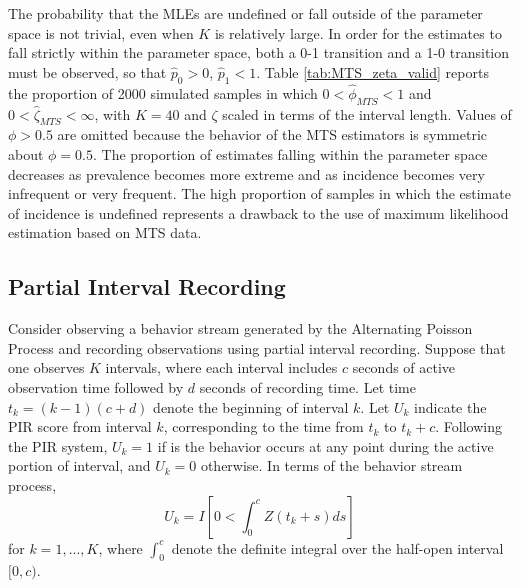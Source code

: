 \documentclass[man, noextraspace, floatsintext]{apa6}\usepackage[]{graphicx}\usepackage[]{color}
\begin{document}
The probability that the MLEs are undefined or fall outside of the parameter space is not trivial, even when $K$ is relatively large. 
In order for the estimates to fall strictly within the parameter space, both a 0-1 transition and a 1-0 transition must be observed, so that $\hat{p}_0 > 0$, $\hat{p}_1 < 1$. Table \ref{tab:MTS_zeta_valid} reports the proportion of 2000 simulated samples in which $0 < \hat\phi_{MTS} < 1$ and $0 < \hat\zeta_{MTS} < \infty$, with $K = 40$ and $\zeta$ scaled in terms of the interval length. 
Values of $\phi > 0.5$ are omitted because the behavior of the MTS estimators is symmetric about $\phi = 0.5$. 
The proportion of estimates falling within the parameter space decreases as prevalence becomes more extreme and as incidence becomes very infrequent or very frequent. 
The high proportion of samples in which the estimate of incidence is undefined represents a drawback to the use of maximum likelihood estimation based on MTS data.

\subsection{Partial Interval Recording}
\label{subsec:PIR}

Consider observing a behavior stream generated by the Alternating Poisson Process and recording observations using partial interval recording. 
Suppose that one observes $K$ intervals, where each interval includes $c$ seconds of active observation time followed by $d$ seconds of recording time. 
Let time $t_k = (k-1)(c + d)$ denote the beginning of interval $k$. Let $U_k$ indicate the PIR score from interval $k$, corresponding to the time from $t_k$ to $t_k + c$. 
Following the PIR system, $U_k = 1$ if is the behavior occurs at any point during the active portion of interval, and $U_k = 0$ otherwise. 
In terms of the behavior stream process, 
\begin{equation}
U_k = I\left[ 0 < \int_0^c Z\left(t_k + s \right) ds\right]
\end{equation}
for $k = 1,...,K$, where $\int_0^c$ denote the definite integral over the half-open interval $[0,c)$.
\end{document}
